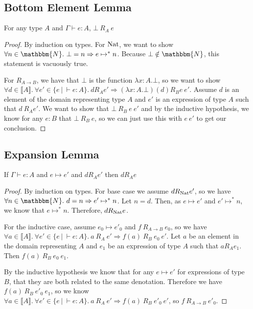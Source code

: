 \subsection{Bottom Element Lemma}

\vspace{0.25cm}

\begin{lem} \label{bot}
For any type $A$ and $\Gamma \vdash e: A$, $\bot \ R_A \ e$ 
\end{lem}

\begin{proof}
By induction on types. For $\operatorname{Nat}$, we want to show $\forall n \in \mathbbm{N}. \ \bot  = n \Rightarrow e \mapsto^* n$. Because $\bot \notin \mathbbm{N}$, this statement is vacuously true.

For $R_{A \to B}$, we have that $\bot$ is the function $\lambda x : A. \bot$, so we want to show $\forall  d \in \llbracket A \rrbracket. \ \forall e' \in \{ e \ | \ \vdash e : A\}. \ d R_A e' \Rightarrow (\lambda x : A. \bot)(d) R_B  e \ e'$. Assume $d$ is an element of the domain representing type $A$ and $e'$ is an expression of type $A$ such that $d \ R_A e'$. We want to show that $\bot \ R_B \ e \ e'$ and by the inductive hypothesis, we know for any $e : B$ that $\bot \ R_B \ e$, so we can just use this with $e \ e'$ to get our conclusion.
\end{proof}

\subsection{Expansion Lemma}\label{exp}

\vspace{0.25cm}

\begin{lem}\label{exp}
If $\Gamma \vdash e : A$ and $e \mapsto e'$ and $d R_A e'$ then $d R_A e$ 
\end{lem}

\begin{proof}
By induction on types. For base case we assume $d R_{\operatorname{Nat}} e'$, so we have $\forall n \in \mathbbm{N}. \ d = n \Rightarrow e' \mapsto^* n$. Let $n = d$. Then, as $e \mapsto e'$ and $e' \mapsto^* n$, we know that $e \mapsto^*n$. Therefore, $d R_{\operatorname{Nat}} e$.

For the inductive case, assume $e_0 \mapsto e'_0$ and $f \ R_{A \to B} \ e_0$, so we have $\forall a \in \llbracket A \rrbracket. \ \forall e' \in \{ e \ | \ \vdash e : A\}. \ a \ R_A \ e' \Rightarrow f(a) \ R_B \ e_0 \ e'$. Let $a$ be an element in the domain representing $A$ and $e_1$ be an expression of type $A$ such that $a R_A e_1$. Then $f(a) \ R_B \ e_0 \ e_1$.

By the inductive hypothesis we know that for any $e \mapsto e'$ for expressions of type $B$, that they are both related to the same denotation. Therefore we have $f(a) \ R_B \ e'_0 \ e_1$, so we know $\forall a \in \llbracket A \rrbracket. \ \forall e' \in \{ e \ | \ \vdash e : A\}. \ a \ R_A \ e' \Rightarrow f(a) \ R_B \ e'_0 \ e'$, so $f \ R_{A \to B} \ e'_0$. 
\end{proof}

